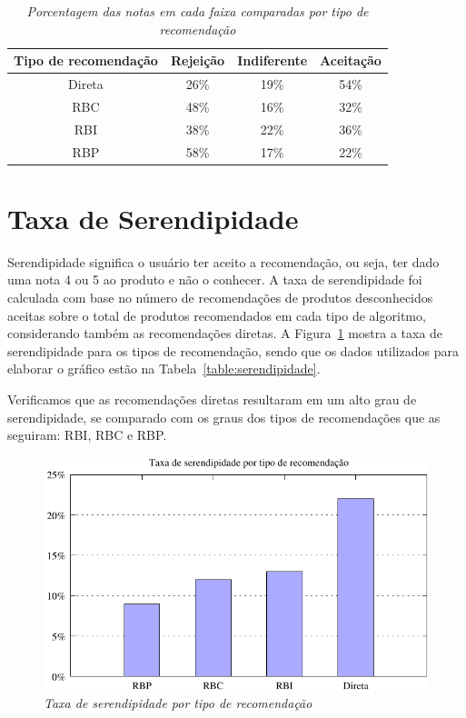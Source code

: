 \begin{table}
\centering
\begin{tabular}{c c c c} 
    \hline \hline
    \textbf{Tipo de recomendação} & \textbf{Rejeição}& \textbf{Indiferente}& \textbf{Aceitação} \\
\hline 
Direta & 26\% & 19\% & 54\% \\
\hline 
RBC & 48\% & 16\% & 32\% \\
\hline 
RBI & 38\% & 22\% & 36\% \\
\hline 
RBP & 58\% & 17\% & 22\% \\
\hline        
\end{tabular}
\caption{\it Porcentagem das notas em cada faixa comparadas por tipo de recomendação}
\label{table:notas}
\end{table}


\section{Taxa de Serendipidade}
\label{sec:taxa_de_serendipidade}

Serendipidade significa o usuário ter aceito a recomendação, ou seja, ter dado uma nota 4 ou 5 ao produto e não o conhecer. A taxa de serendipidade foi calculada com base no número de recomendações de produtos desconhecidos aceitas sobre o total de produtos recomendados em cada tipo de algoritmo, considerando também as recomendações diretas. A Figura~\ref{fig:serendipidade} mostra a taxa de serendipidade para os tipos de recomendação, sendo que os dados utilizados para elaborar o gráfico estão na Tabela~\ref{table:serendipidade}.

Verificamos que as recomendações diretas resultaram em um alto grau de serendipidade, se comparado com os graus dos tipos de recomendações que as seguiram: RBI, RBC e RBP.

\begin{figure}
    \centering
    \includegraphics[width=\textwidth]{imagens/grafico_serendipidade}
    \caption{\it Taxa de serendipidade por tipo de recomendação}
    \label{fig:serendipidade}
\end{figure}

